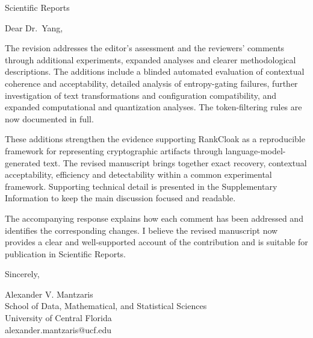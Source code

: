 \documentclass[10pt]{letter}
\begin{document}
\begin{letter}{Scientific Reports}
\opening{Dear Dr.\ Yang,}
The revision addresses the editor’s assessment and the reviewers’ comments through additional experiments, expanded analyses and clearer methodological descriptions. The additions include a blinded automated evaluation of contextual coherence and acceptability, detailed analysis of entropy-gating failures, further investigation of text transformations and configuration compatibility, and expanded computational and quantization analyses. The token-filtering rules are now documented in full.

These additions strengthen the evidence supporting RankCloak as a reproducible framework for representing cryptographic artifacts through language-model-generated text. The revised manuscript brings together exact recovery, contextual acceptability, efficiency and detectability within a common experimental framework. Supporting technical detail is presented in the Supplementary Information to keep the main discussion focused and readable.

The accompanying response explains how each comment has been addressed and identifies the corresponding changes. I believe the revised manuscript now provides a clear and well-supported account of the contribution and is suitable for publication in Scientific Reports.

\closing{Sincerely,}
Alexander V. Mantzaris\\
School of Data, Mathematical, and Statistical Sciences\\
University of Central Florida\\
alexander.mantzaris@ucf.edu
\end{letter}
\end{document}
